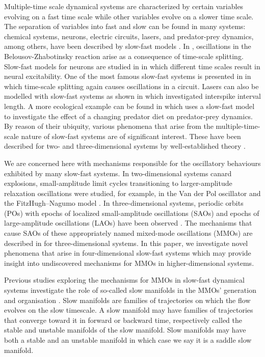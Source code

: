 \documentclass{ws-ijbc}
\begin{document}
Multiple-time scale dynamical systems are characterized by certain variables evolving on a fast time scale while other variables evolve on a slower time scale.  The separation of variables into fast and slow can be found in many systems: chemical systems, neurons, electric circuits, lasers, and predator-prey dynamics, among others, have been described by slow-fast models  \cite{BZ_reaction, Neurons, Circuits, lasers, Predator-Prey}.  In \cite{BZ_reaction}, oscillations in the Belousov-Zhabotinsky reaction arise as a consequence of time-scale splitting.  Slow-fast models for neurons are studied in \cite{Neurons} in which different time scales result in neural excitability.  One of the most famous slow-fast systems is presented in \cite{Circuts} in which time-scale splitting again causes oscillations in a circuit.  Lasers can also be modelled with slow-fast systems as shown in \cite{lasers} which investigated interspike interval length.  A more ecological example can be found in \cite{Predator-Prey} which uses a slow-fast model to investigate the effect of a changing predator diet on predator-prey dynamics.  By reason of their ubiquity, various phenomena that arise from the multiple-time-scale nature of slow-fast systems are of significant interest. These have been described for two- and three-dimensional systems by well-established theory \cite{canard_explosion, lents-rapides, enlacement,singular_hopf, folded_node,three}.

We are concerned here with mechanisms responsible for the oscillatory behaviours exhibited by many slow-fast systems.  In two-dimensional systems canard explosions, small-amplitude limit cycles transitioning to larger-amplitude relaxation oscillations were studied, for example, in the Van der Pol oscillator and the FitzHugh--Nagumo model \cite{canard_explosion, fitz-hugh-nagumo}.  In three-dimensional systems, periodic orbits (POs) with epochs of localized small-amplitude oscillations (SAOs) and epochs of large-amplitude oscillations (LAOs) have been observed \cite{BZ}.  The mechanisms that cause SAOs of these appropriately named mixed-mode oscillations (MMOs) are described in \cite{MMO} for three-dimensional systems.  In this paper, we investigate novel phenomena that arise in four-dimensional slow-fast systems which may provide insight into undiscovered mechanisms for MMOs in higher-dimensional systems.

Previous studies exploring the mechanisms for MMOs in slow-fast dynamical systems investigate the role of so-called slow manifolds in the MMOs' generation and organisation \cite{Vo_paper, Vo_paper2, Emily_Harvey_paper, Martin_neuron_paper, Cris_paper}.  Slow manifolds are families of trajectories on which the flow evolves on the slow timescale.  A slow manifold may have families of trajectories that converge toward it in forward or backward time, respectively called the stable and unstable manifolds of the slow manifold.  Slow manifolds may have both a stable and an unstable manifold in which case we say it is a saddle slow manifold.  
\end{document}
